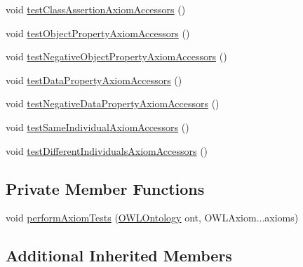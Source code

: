 \begin{DoxyCompactItemize}
\item 
void \hyperlink{classorg_1_1semanticweb_1_1owlapi_1_1api_1_1test_1_1ontology_1_1_o_w_l_ontology_accessors_test_case_a784c972428ab2082bf7be8cb2e4642ee}{test\-Class\-Assertion\-Axiom\-Accessors} ()
\item 
void \hyperlink{classorg_1_1semanticweb_1_1owlapi_1_1api_1_1test_1_1ontology_1_1_o_w_l_ontology_accessors_test_case_ad7fa27791578650df0d841d40b768f98}{test\-Object\-Property\-Axiom\-Accessors} ()
\item 
void \hyperlink{classorg_1_1semanticweb_1_1owlapi_1_1api_1_1test_1_1ontology_1_1_o_w_l_ontology_accessors_test_case_aeff295bb65ec859f41d9b8c253d05f96}{test\-Negative\-Object\-Property\-Axiom\-Accessors} ()
\item 
void \hyperlink{classorg_1_1semanticweb_1_1owlapi_1_1api_1_1test_1_1ontology_1_1_o_w_l_ontology_accessors_test_case_a453e2c9dda8921defb159c1fc50ca1ef}{test\-Data\-Property\-Axiom\-Accessors} ()
\item 
void \hyperlink{classorg_1_1semanticweb_1_1owlapi_1_1api_1_1test_1_1ontology_1_1_o_w_l_ontology_accessors_test_case_a0bc6d60ddeb06c237b553b7d05cd8d06}{test\-Negative\-Data\-Property\-Axiom\-Accessors} ()
\item 
void \hyperlink{classorg_1_1semanticweb_1_1owlapi_1_1api_1_1test_1_1ontology_1_1_o_w_l_ontology_accessors_test_case_af43c671662ee14d807da3f7c7e509412}{test\-Same\-Individual\-Axiom\-Accessors} ()
\item 
void \hyperlink{classorg_1_1semanticweb_1_1owlapi_1_1api_1_1test_1_1ontology_1_1_o_w_l_ontology_accessors_test_case_a31a54157197169286ca123ceb2982d38}{test\-Different\-Individuals\-Axiom\-Accessors} ()
\end{DoxyCompactItemize}
\subsection*{Private Member Functions}
\begin{DoxyCompactItemize}
\item 
void \hyperlink{classorg_1_1semanticweb_1_1owlapi_1_1api_1_1test_1_1ontology_1_1_o_w_l_ontology_accessors_test_case_ab9be06c6537cd6c3d0cdb2d1197c480f}{perform\-Axiom\-Tests} (\hyperlink{interfaceorg_1_1semanticweb_1_1owlapi_1_1model_1_1_o_w_l_ontology}{O\-W\-L\-Ontology} ont, O\-W\-L\-Axiom...\-axioms)
\end{DoxyCompactItemize}
\subsection*{Additional Inherited Members}


